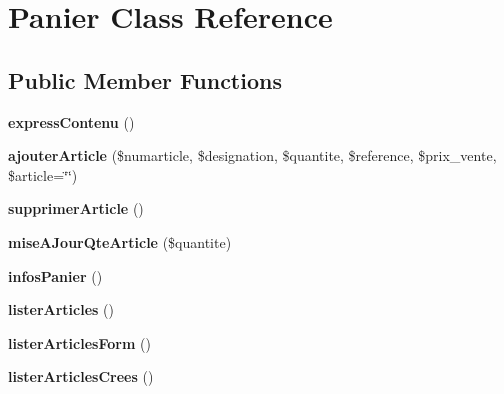 \hypertarget{class_panier}{
\section{Panier Class Reference}
\label{class_panier}
}
\subsection*{Public Member Functions}
\begin{DoxyCompactItemize}
\item 
\hypertarget{class_panier_a80e74133b6bcf977946f741104a15d91}{
{\bfseries expressContenu} ()}
\label{class_panier_a80e74133b6bcf977946f741104a15d91}

\item 
\hypertarget{class_panier_ac406296199d32aa47266dafcbc7b27fd}{
{\bfseries ajouterArticle} (\$numarticle, \$designation, \$quantite, \$reference, \$prix\_\-vente, \$article=\char`\"{}\char`\"{})}
\label{class_panier_ac406296199d32aa47266dafcbc7b27fd}

\item 
\hypertarget{class_panier_a12a74656254132203cbb81273979a314}{
{\bfseries supprimerArticle} ()}
\label{class_panier_a12a74656254132203cbb81273979a314}

\item 
\hypertarget{class_panier_acfbe7f84abd54cf570030ad6ecfefeb1}{
{\bfseries miseAJourQteArticle} (\$quantite)}
\label{class_panier_acfbe7f84abd54cf570030ad6ecfefeb1}

\item 
\hypertarget{class_panier_a34442409d2d4f73e498bc6e442e0f9b1}{
{\bfseries infosPanier} ()}
\label{class_panier_a34442409d2d4f73e498bc6e442e0f9b1}

\item 
\hypertarget{class_panier_a3a7687af6dfdf8ba70d81795e2ab6e09}{
{\bfseries listerArticles} ()}
\label{class_panier_a3a7687af6dfdf8ba70d81795e2ab6e09}

\item 
\hypertarget{class_panier_a133bfbb4062f47f8749e561cabd7d2d4}{
{\bfseries listerArticlesForm} ()}
\label{class_panier_a133bfbb4062f47f8749e561cabd7d2d4}

\item 
\hypertarget{class_panier_abed26b48b8cdd8b71d29b7ab09debb8f}{
{\bfseries listerArticlesCrees} ()}
\label{class_panier_abed26b48b8cdd8b71d29b7ab09debb8f}

\end{DoxyCompactItemize}
